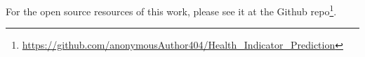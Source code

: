 \documentclass[smallextended]{svjour3}
\begin{document}
 

For the open source resources of this work, please see it at the Github repo\footnote{\url{https://github.com/anonymousAuthor404/Health_Indicator_Prediction}}.











\end{document}
